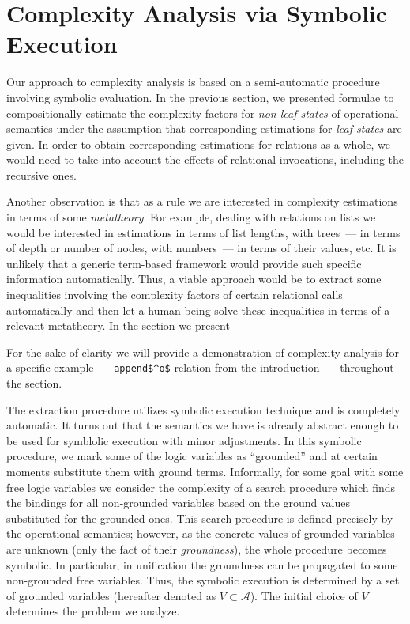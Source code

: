\section{Complexity Analysis via Symbolic Execution}
\label{sec:symbolic}

Our approach to complexity analysis is based on a semi-automatic procedure involving symbolic evaluation.
In the previous section, we presented formulae to compositionally estimate the complexity factors for
\emph{non-leaf states} of operational semantics under the assumption that corresponding estimations for
\emph{leaf states} are given. In order to obtain corresponding estimations for relations as a whole, we
would need to take into account the effects of relational invocations, including the recursive ones.

Another observation is that as a rule we are interested in complexity estimations in terms of some \emph{metatheory}. For
example, dealing with relations on lists we would be interested in estimations in terms of list lengths,
with trees~--- in terms of depth or number of nodes, with numbers~--- in terms of their values, etc. It is
unlikely that a generic term-based framework would provide such specific information automatically. Thus,
a viable approach would be to extract some inequalities involving the complexity factors of certain relational
calls automatically and then let a human being solve these inequalities in terms of a relevant metatheory.
In the section we present 

For the sake of clarity we will provide a demonstration of complexity analysis for a specific example~---
\lstinline|append$^o$| relation from the introduction~--- throughout the section.

The extraction procedure utilizes symbolic execution technique and is completely automatic.
It turns out that the semantics we have is already abstract enough to be used for symblolic
execution with minor adjustments.
In this symbolic procedure, we mark some of the logic variables as ``grounded'' and at certain
moments substitute them with ground terms.
Informally, for some goal with some free logic variables we consider the complexity of a search
procedure which finds the bindings for all non-grounded variables based on the ground values
substituted for the grounded ones.
This search procedure is defined precisely by the operational semantics; however, as the concrete
values of grounded variables are unknown (only the fact of their \emph{groundness}), the whole
procedure becomes symbolic.
In particular, in unification the groundness can be propagated to some non-grounded free variables.
Thus, the symbolic execution is determined by a set of grounded variables (hereafter denoted
as $V\subset\mathcal A$). The initial choice of $V$ determines the problem we analyze.

